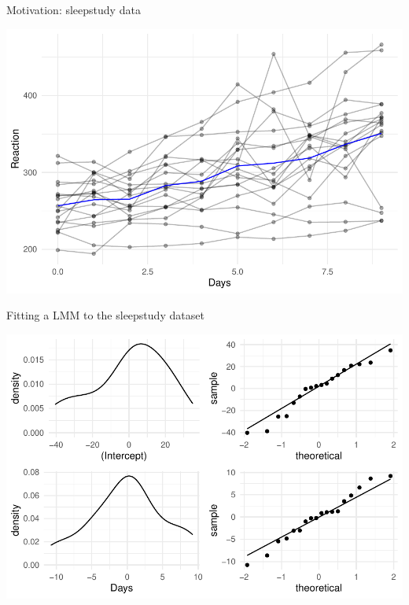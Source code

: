 \begin{frame}{Motivation: sleepstudy data}
\protect\hypertarget{motivation-sleepstudy-data-1}{}

\begin{center}\includegraphics[width=0.85\linewidth]{codes_files/figure-beamer/data-1} \end{center}

\end{frame}

\begin{frame}[fragile]{Fitting a LMM to the sleepstudy dataset}
\protect\hypertarget{fitting-a-lmm-to-the-sleepstudy-dataset}{}

\begin{Shaded}
\begin{Highlighting}[]
\StringTok{ }\OperatorTok{~}
            \OperatorTok{~}\OperatorTok{|}
\end{Highlighting}
\end{Shaded}

\begin{center}\includegraphics[width=0.7\linewidth]{codes_files/figure-beamer/fit1plot-1} \end{center}

\end{frame}

